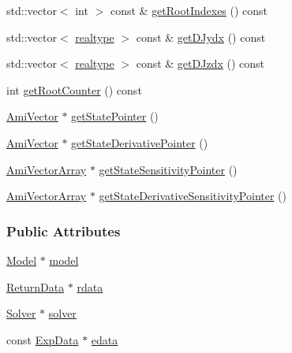 \begin{DoxyCompactItemize}
\item 
std\+::vector$<$ int $>$ const  \& \mbox{\hyperlink{classamici_1_1_forward_problem_a81f0a7c547a343c3bcd179ba5439beb3}{get\+Root\+Indexes}} () const
\item 
std\+::vector$<$ \mbox{\hyperlink{namespaceamici_a1bdce28051d6a53868f7ccbf5f2c14a3}{realtype}} $>$ const  \& \mbox{\hyperlink{classamici_1_1_forward_problem_afb4ec4e3a67624dddea0cd64fca29ae9}{get\+D\+Jydx}} () const
\item 
std\+::vector$<$ \mbox{\hyperlink{namespaceamici_a1bdce28051d6a53868f7ccbf5f2c14a3}{realtype}} $>$ const  \& \mbox{\hyperlink{classamici_1_1_forward_problem_a3ea9fa40cc5f7ce1f4e1bd0a6db0f785}{get\+D\+Jzdx}} () const
\item 
int \mbox{\hyperlink{classamici_1_1_forward_problem_a9ba8c1d4ef2ba23e6f4faaaefd28aae9}{get\+Root\+Counter}} () const
\item 
\mbox{\hyperlink{classamici_1_1_ami_vector}{Ami\+Vector}} $\ast$ \mbox{\hyperlink{classamici_1_1_forward_problem_a0efbb7c64b718e9b8b8020acd59afb78}{get\+State\+Pointer}} ()
\item 
\mbox{\hyperlink{classamici_1_1_ami_vector}{Ami\+Vector}} $\ast$ \mbox{\hyperlink{classamici_1_1_forward_problem_a096d23f8405c903ca5d5d4efec5facc0}{get\+State\+Derivative\+Pointer}} ()
\item 
\mbox{\hyperlink{classamici_1_1_ami_vector_array}{Ami\+Vector\+Array}} $\ast$ \mbox{\hyperlink{classamici_1_1_forward_problem_a5ef9198bc0b08dc9e67efcd5dcf64ced}{get\+State\+Sensitivity\+Pointer}} ()
\item 
\mbox{\hyperlink{classamici_1_1_ami_vector_array}{Ami\+Vector\+Array}} $\ast$ \mbox{\hyperlink{classamici_1_1_forward_problem_a440eebbd8bf6a343ff7ee80ddc39b0a0}{get\+State\+Derivative\+Sensitivity\+Pointer}} ()
\end{DoxyCompactItemize}
\subsubsection*{Public Attributes}
\begin{DoxyCompactItemize}
\item 
\mbox{\hyperlink{classamici_1_1_model}{Model}} $\ast$ \mbox{\hyperlink{classamici_1_1_forward_problem_a7b56c3ca57dde73bdbc8dbe9772bca19}{model}}
\item 
\mbox{\hyperlink{classamici_1_1_return_data}{Return\+Data}} $\ast$ \mbox{\hyperlink{classamici_1_1_forward_problem_a4c0807651f0594a186e8856f22e442cc}{rdata}}
\item 
\mbox{\hyperlink{classamici_1_1_solver}{Solver}} $\ast$ \mbox{\hyperlink{classamici_1_1_forward_problem_ae1ad25a4dd6b076c27672dc94d11dad0}{solver}}
\item 
const \mbox{\hyperlink{classamici_1_1_exp_data}{Exp\+Data}} $\ast$ \mbox{\hyperlink{classamici_1_1_forward_problem_a9ec6aee8cd7c91d0e49aed6e3d0db4ce}{edata}}
\end{DoxyCompactItemize}


